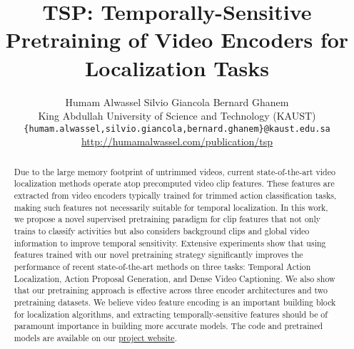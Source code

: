 \documentclass[10pt,twocolumn,letterpaper]{article}
\begin{document}
\title{TSP: Temporally-Sensitive Pretraining of Video Encoders for Localization Tasks} 

\author{
Humam Alwassel \quad
Silvio Giancola \quad
Bernard Ghanem \\
King Abdullah University of Science and Technology (KAUST) \\
{\tt\small\{humam.alwassel,silvio.giancola,bernard.ghanem\}@kaust.edu.sa} \\
{{{\url{http://humamalwassel.com/publication/tsp}}}}
}

\maketitle

\newcommand{\ahat}{\hat{\textbf{a}}}
\newcommand{\av}{\textbf{a}}
\newcommand{\bv}{\textbf{b}}
\newcommand{\cv}{\textbf{c}}
\newcommand{\dv}{\textbf{d}}
\newcommand{\uv}{\textbf{u}}
\newcommand{\vv}{\textbf{v}}
\newcommand{\x}{\textbf{x}}
\newcommand{\X}{\textbf{X}}
\newcommand{\y}{\textbf{y}}
\newcommand{\Y}{\textbf{Y}}
\newcommand{\z}{\textbf{z}}
\newcommand{\w}{\textbf{w}}
\newcommand{\W}{\textbf{W}}
\newcommand{\p}{\textbf{p}}
\newcommand{\q}{\textbf{q}}
\newcommand{\h}{\textbf{h}}
\newcommand{\A}{\textbf{A}}
\newcommand{\C}{\textbf{C}}
\newcommand{\D}{\textbf{D}}
\newcommand{\F}{\textbf{F}}
\newcommand{\V}{\textbf{V}}
\newcommand{\U}{\textbf{U}}
\newcommand{\I}{\textbf{I}}
\newcommand{\PX}{\textbf{P}}
\newcommand{\mSigma}{\mathbf{\Sigma}}
\newcommand{\0}{\mathbf{0}}
\newcommand{\1}{\mathbf{1}}

\begin{abstract}
Due to the large memory footprint of untrimmed videos, current state-of-the-art video localization methods operate atop precomputed video clip features. These features are extracted from video encoders typically trained for trimmed action classification tasks, making such features not necessarily suitable for temporal localization. In this work, we propose a novel supervised pretraining paradigm for clip features that not only trains to classify activities but also considers background clips and global video information to improve temporal sensitivity. Extensive experiments show that using features trained with our novel pretraining strategy significantly improves the performance of recent state-of-the-art methods on three tasks: Temporal Action Localization, Action Proposal Generation, and Dense Video Captioning. We also show that our pretraining approach is effective across three encoder architectures and two pretraining datasets. We believe video feature encoding is an important building block for localization algorithms, and extracting temporally-sensitive features should be of paramount importance in building more accurate models. The code and pretrained models are available on our \href{http://humamalwassel.com/publication/tsp/}{project website}.
\vspace{-10pt}
\end{abstract}
\end{document}
